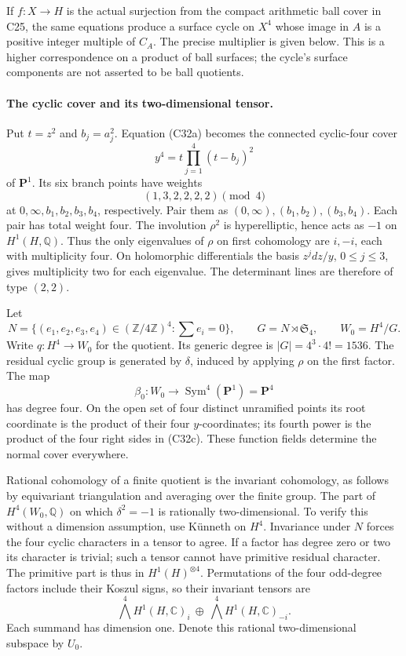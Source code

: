 \documentclass[11pt]{article}
\newcommand{\Q}{\mathbb Q}\newcommand{\C}{\mathbb C}\newcommand{\Z}{\mathbb Z}\newcommand{\R}{\mathbb R}\newcommand{\A}{\mathbb A}\newcommand{\OO}{\mathcal O}
\theoremstyle{definition}\newtheorem{definition}[theorem]{Definition}\newtheorem{remark}[theorem]{Remark}
\begin{document}
If $f:X\to H$ is the actual surjection from the
compact arithmetic ball cover in C25, the same
equations produce a surface cycle on $X^4$ whose
image in $A$ is a positive integer multiple of
$C_A$.  The precise multiplier is given below.
This is a higher correspondence on a product of
ball surfaces; the cycle's surface components are
not asserted to be ball quotients.

\paragraph{The cyclic cover and its two-dimensional tensor.}
Put $t=z^2$ and $b_j=a_j^2$.  Equation (C32a)
becomes the connected cyclic-four cover
\[
       y^4=t\prod_{j=1}^4(t-b_j)^2
                                                        \tag{C32c}
\]
of $\mathbf P^1$.  Its six branch points have
weights
\[
                 (1,3,2,2,2,2)\pmod4
                                                        \tag{C32d}
\]
at $0,\infty,b_1,b_2,b_3,b_4$, respectively.
Pair them as $(0,\infty),(b_1,b_2),(b_3,b_4)$.
Each pair has total weight four.  The involution
$\rho^2$ is hyperelliptic, hence acts as $-1$ on
$H^1(H,\Q)$.  Thus the only eigenvalues of $\rho$
on first cohomology are $i,-i$, each with multiplicity
four.  On holomorphic differentials the basis
$z^jdz/y$, $0\leq j\leq3$, gives multiplicity two
for each eigenvalue.  The determinant lines are
therefore of type $(2,2)$.

Let
\[
 N=\{(e_1,e_2,e_3,e_4)\in(\Z/4\Z)^4:
                                      \sum e_i=0\},
 \qquad G=N\rtimes\mathfrak S_4,
 \qquad W_0=H^4/G.
                                                        \tag{C32e}
\]
Write $q:H^4\to W_0$ for the quotient.  Its generic
degree is $|G|=4^3\cdot4!=1536$.  The residual
cyclic group is generated by $\delta$, induced by
applying $\rho$ on the first factor.  The map
\[
             \beta_0:W_0\longrightarrow
                  \operatorname{Sym}^4(\mathbf P^1)=\mathbf P^4
\]
has degree four.  On the open set of four distinct
unramified points its root coordinate is the product
of their four $y$-coordinates; its fourth power is
the product of the four right sides in (C32c).
These function fields determine the normal cover
everywhere.

Rational cohomology of a finite quotient is the
invariant cohomology, as follows by equivariant
triangulation and averaging over the finite group.
The part of $H^4(W_0,\Q)$ on which $\delta^2=-1$
is rationally two-dimensional.  To verify this
without a dimension assumption, use K\"unneth on
$H^4$.  Invariance under $N$ forces the four
cyclic characters in a tensor to agree.  If a
factor has degree zero or two its character is
trivial; such a tensor cannot have primitive
residual character.  The primitive part is thus
in $H^1(H)^{\otimes4}$.  Permutations of the four
odd-degree factors include their Koszul signs,
so their invariant tensors are
\[
     \bigwedge^4 H^1(H,\C)_i
          \ \oplus\ 
     \bigwedge^4 H^1(H,\C)_{-i}.
                                                        \tag{C32f}
\]
Each summand has dimension one.  Denote this
rational two-dimensional subspace by $U_0$.
\end{document}
